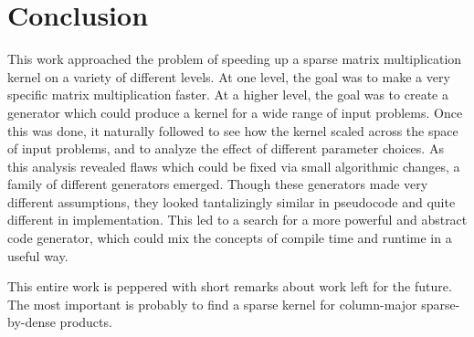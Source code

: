 
\chapter{Conclusion}
\label{chapter:conclusion}


This work approached the problem of speeding up a sparse matrix multiplication kernel on a variety of different levels. At one level, the goal was to make a very specific matrix multiplication faster. At a higher level, the goal was to create a generator which could produce a kernel for a wide range of input problems. Once this was done, it naturally followed to see how the kernel scaled across the space of input problems, and to analyze the effect of different parameter choices. As this analysis revealed flaws which could be fixed via small algorithmic changes, a family of different generators emerged. Though these generators made very different assumptions, they looked tantalizingly similar in pseudocode and quite different in implementation. This led to a search for a more powerful and abstract code generator, which could mix the concepts of compile time and runtime in a useful way.

This entire work is peppered with short remarks about work left for the future. The most important is probably to find a sparse kernel for column-major sparse-by-dense products.

